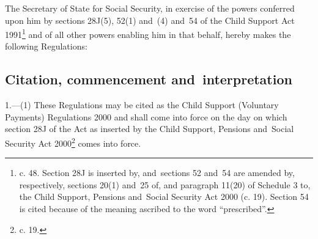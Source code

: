 \documentclass[12pt,a4paper]{article}
\title{\regstitle}
\author{S.I. 2000 No. 3177}
\date{Made 30th November 2000\\Laid before Parliament 6th December 2000\\Coming into force as provided in regulation~1(1)}
\begin{document}
\maketitle


\medskip

\noindent
The Secretary of State for Social Security, in exercise of the powers conferred upon him by sections 28J(5), 52(1) and~(4) and~54 of the Child Support Act 1991\footnote{ c. 48. Section 28J is inserted by, and~sections 52 and~54 are amended by, respectively, sections 20(1) and~25 of, and paragraph 11(20) of Schedule 3 to, the Child Support, Pensions and~Social Security Act 2000 (c. 19). Section 54 is cited because of the meaning ascribed to the word “prescribed”.} and of all other powers enabling him in that behalf, hereby makes the following Regulations: 

{\sloppy

\tableofcontents

}

\bigskip

\setcounter{secnumdepth}{-2}

\subsection[1. Citation, commencement and~interpretation]{Citation, commencement and~interpretation}

1.---(1)  These Regulations may be cited as the Child Support (Voluntary Payments) Regulations 2000 and shall come into force on the day on which section 28J of the Act as inserted by the Child Support, Pensions and~Social Security Act 2000\footnote{ c. 19.} comes into force.
\end{document}
